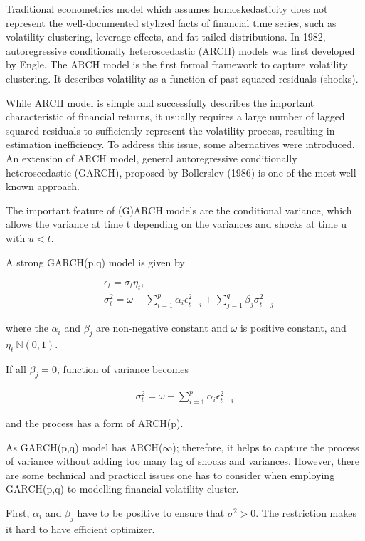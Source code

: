 \documentclass[12pt,a4paper]{article}
\numberwithin{equation}{section}
\begin{document}
Traditional econometrics model which assumes homoskedasticity does not represent the well-documented stylized facts of financial time series, such as volatility clustering, leverage effects, and fat-tailed distributions. In 1982, autoregressive conditionally heteroscedastic (ARCH) models was first developed by Engle. The ARCH model is the first formal framework to capture volatility clustering. It describes volatility as a function of past squared residuals (shocks).

While ARCH model is simple and successfully describes the important characteristic of financial returns, it usually requires a large number of lagged squared residuals to sufficiently represent the volatility process, resulting in estimation inefficiency. To address this issue, some alternatives were introduced. An extension of ARCH model, general autoregressive conditionally heteroscedastic (GARCH),  proposed by Bollerslev (1986) is one of the most well-known approach. 

The important feature of (G)ARCH models are the conditional variance, which allows the variance at time t depending on the variances and shocks at time u with $u<t$.

A strong GARCH(p,q) model is given by

 \begin{align*}
 &\epsilon_t = \sigma_t \eta_t,\\[0.6em]
 &\sigma_t^2 = \omega + \sum_{i=1}^p \alpha_i \epsilon_{t-i}^2+ \sum_{j=1}^q \beta_j \sigma_{t-j}^2
 \end{align*}
 
 where the $\alpha_i$ and $\beta_j$ are non-negative constant and $\omega$ is positive constant, and $\eta_t ~ \mathbb{N}(0,1)$.

If all $\beta_j =0$, function of variance becomes


 \begin{align*}
 \sigma_t^2 = \omega + \sum_{i=1}^p \alpha_i \epsilon_{t-i}^2
 \end{align*}
 
 and the process has a form of ARCH(p).
 
As GARCH(p,q) model has ARCH($\infty$); therefore, it helps to capture the process of variance without adding too many lag of shocks and variances. However, there are some technical and practical issues one has to consider when employing GARCH(p,q) to modelling financial volatility cluster.

First, $\alpha_i$ and $\beta_j$ have to be positive to ensure that $\sigma^2 >0$. The restriction makes it hard to have efficient optimizer.
\end{document}
